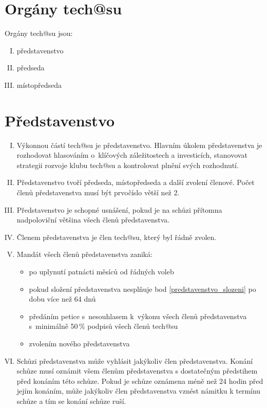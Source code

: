 \documentclass[10pt]{article}
\begin{document}
\section{Orgány tech@su} %
Orgány tech@su jsou:
	\begin{enumerate}[I.]
	\item představenstvo 
	\item předseda  
	\item místopředseda  
	\end{enumerate}

\section{Představenstvo} %
	\begin{enumerate}[I.]
	\item Výkonnou částí tech@su je představenstvo. Hlavním úkolem představenstva je rozhodovat hlasováním o~klíčových záležitostech a investicích, stanovovat strategii rozvoje klubu tech@su a kontrolovat plnění svých rozhodnutí. 
	\item \label{predstavenstvo_slozeni} Představenstvo tvoří předseda, místopředseda a další zvolení členové. Počet členů představenstva musí být prvočíslo větší než 2.
	\item Představenstvo je schopné usnášení, pokud je na schůzi přítomna nadpoloviční většina všech členů představenstva.
	\item Členem představenstva je člen tech@su, který byl řádně zvolen.
	\item Mandát všech členů představenstva zaniká:
	\begin{itemize}
		\item po uplynutí patnácti měsíců od řádných voleb
		\item pokud složení představenstva nesplňuje bod \ref{predstavenstvo_slozeni} po dobu více než 64 dnů
		\item předáním petice s~nesouhlasem k~výkonu všech členů představenstva s~minimálně 50\,\% podpisů všech členů tech@su
		\item zvolením nového představenstva
	\end{itemize}

	\item Schůzi představenstva může vyhlásit jakýkoliv člen představenstva. Konání schůze musí oznámit všem členům představenstva s dostatečným předstihem před konáním této schůze. Pokud je schůze oznámena méně než 24 hodin před jejím konáním, může jakýkoliv člen představenstva vznést námitku k termínu schůze a tím se konání schůze ruší.



\end{enumerate}
\end{document}
